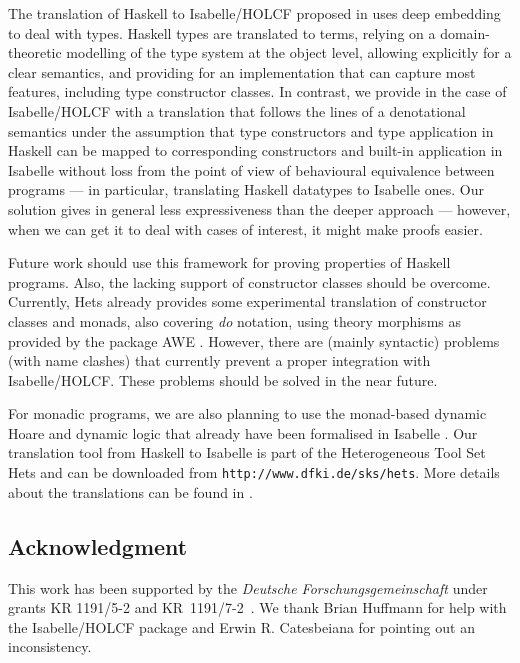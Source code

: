 \documentclass{llncs}
\begin{document}
The translation of Haskell to Isabelle/HOLCF proposed in \cite{Huff}
uses deep embedding to deal with types.  Haskell types are translated
to terms, relying on a domain-theoretic modelling of the type system
at the object level, allowing explicitly for a clear semantics, and
providing for an implementation that can capture most features,
including type constructor classes.  In contrast, we provide in the
case of Isabelle/HOLCF with a translation that follows the lines of a
denotational semantics under the assumption that type constructors and
type application in Haskell can be mapped to corresponding
constructors and built-in application in Isabelle without loss from
the point of view of behavioural equivalence between programs --- in
particular, translating Haskell datatypes to Isabelle ones.  Our
solution gives in general less expressiveness than the deeper approach
--- however, when we can get it to deal with cases of interest, it
might make proofs easier.



Future work should use this framework for proving properties of
Haskell programs.  Also, the lacking support of constructor classes should
be overcome. Currently, Hets already provides some experimental
translation of constructor classes and monads, also covering \emph{do}
notation, using theory morphisms as provided by the package AWE
\cite{AWE}. However, there are (mainly syntactic) problems (with name
clashes) that currently prevent a proper integration with
Isabelle/HOLCF. These problems should be solved in the near future.

For monadic programs, we are also planning to use the monad-based
dynamic Hoare and dynamic logic that already have been formalised in
Isabelle \cite{Walter05}. Our translation tool from Haskell to
Isabelle is part of the Heterogeneous Tool Set Hets and can be
downloaded from \texttt{http://www.dfki.de/sks/hets}. More details
about the translations can be found in \cite{Tlmm}.



\subsection*{Acknowledgment}
This work has been supported by the {\em Deutsche
  Forschungsgemeinschaft} under grants KR \mbox{1191/5-2} and \mbox{KR
  1191/7-2 }. We thank Brian Huffmann for help with the Isabelle/HOLCF
package and Erwin R. Catesbeiana for pointing out an inconsistency.

 
\end{document}
